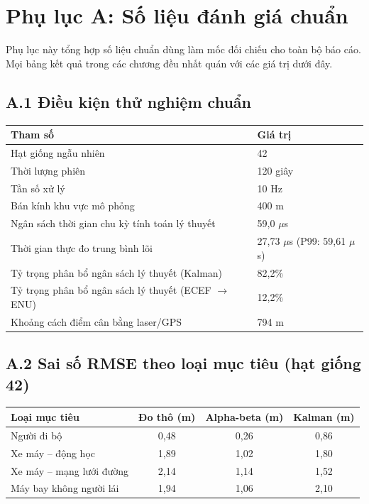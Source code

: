 \section*{Phụ lục A: Số liệu đánh giá chuẩn}

\hspace{0.5cm} Phụ lục này tổng hợp số liệu chuẩn dùng làm mốc đối chiếu cho toàn bộ báo cáo. Mọi bảng kết quả trong các chương đều nhất quán với các giá trị dưới đây.

\subsection*{A.1 Điều kiện thử nghiệm chuẩn}

\begin{table}[H]
\centering
\begin{tabular}{ll}
\toprule
\textbf{Tham số} & \textbf{Giá trị} \\
\midrule
Hạt giống ngẫu nhiên & 42 \\
Thời lượng phiên & 120 giây \\
Tần số xử lý & 10 Hz \\
Bán kính khu vực mô phỏng & 400 m \\
Ngân sách thời gian chu kỳ tính toán lý thuyết & 59{,}0 $\mu$s \\
Thời gian thực đo trung bình lõi & 27{,}73 $\mu$s (P99: 59{,}61 $\mu$s) \\
Tỷ trọng phân bổ ngân sách lý thuyết (Kalman) & 82{,}2\% \\
Tỷ trọng phân bổ ngân sách lý thuyết (ECEF $\to$ ENU) & 12{,}2\% \\
Khoảng cách điểm cân bằng laser/GPS & 794 m \\
\bottomrule
\end{tabular}
\end{table}

\subsection*{A.2 Sai số RMSE theo loại mục tiêu (hạt giống 42)}

\begin{table}[H]
\centering
\begin{tabular}{lccc}
\toprule
\textbf{Loại mục tiêu} & \textbf{Đo thô (m)} & \textbf{Alpha-beta (m)} & \textbf{Kalman (m)} \\
\midrule
Người đi bộ & 0{,}48 & 0{,}26 & 0{,}86 \\
Xe máy -- động học & 1{,}89 & 1{,}02 & 1{,}80 \\
Xe máy -- mạng lưới đường & 2{,}14 & 1{,}14 & 1{,}52 \\
Máy bay không người lái & 1{,}94 & 1{,}06 & 2{,}10 \\
\bottomrule
\end{tabular}
\end{table}

